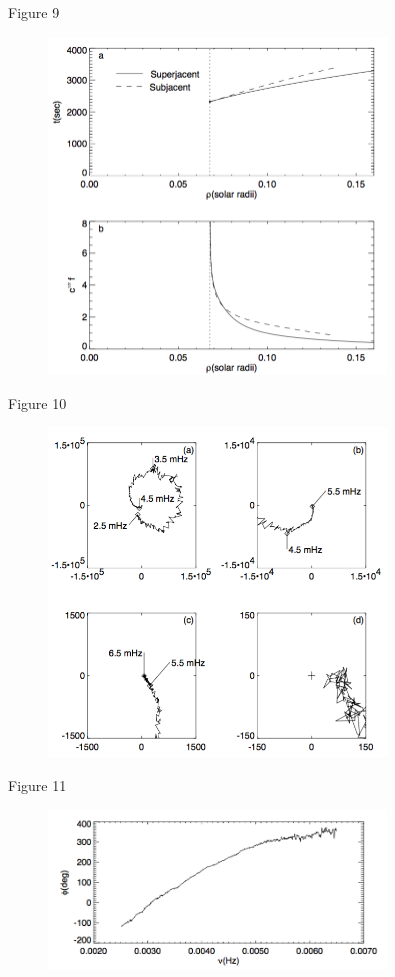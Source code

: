 \documentclass{beamer}
\begin{document}
\begin{frame}{Figure 9}
    \begin{figure}
        \includegraphics[width=0.8\textwidth]{fig_9.png}
    \end{figure}
\end{frame}

\begin{frame}{Figure 10}
    \begin{figure}
        \includegraphics[width=0.8\textwidth]{fig_10.png}
    \end{figure}
\end{frame}

\begin{frame}{Figure 11}
    \begin{figure}
        \includegraphics[width=0.8\textwidth]{fig_11.png}
    \end{figure}
\end{frame}

\end{document}
